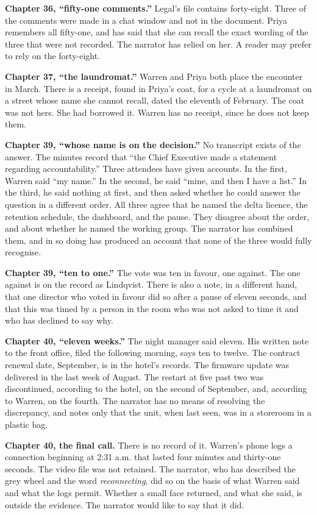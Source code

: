 {\textbf{Chapter 36, ``fifty-one comments.''} Legal's file contains forty-eight. Three of the comments were made in a chat window and not in the document. Priya remembers all fifty-one, and has said that she can recall the exact wording of the three that were not recorded. The narrator has relied on her. A reader may prefer to rely on the forty-eight.

\textbf{Chapter 37, ``the laundromat.''} Warren and Priya both place the encounter in March. There is a receipt, found in Priya's coat, for a cycle at a laundromat on a street whose name she cannot recall, dated the eleventh of February. The coat was not hers. She had borrowed it. Warren has no receipt, since he does not keep them.

\textbf{Chapter 39, ``whose name is on the decision.''} No transcript exists of the answer. The minutes record that ``the Chief Executive made a statement regarding accountability.'' Three attendees have given accounts. In the first, Warren said ``my name.'' In the second, he said ``mine, and then I have a list.'' In the third, he said nothing at first, and then asked whether he could answer the question in a different order. All three agree that he named the delta licence, the retention schedule, the dashboard, and the pause. They disagree about the order, and about whether he named the working group. The narrator has combined them, and in so doing has produced an account that none of the three would fully recognise.

\textbf{Chapter 39, ``ten to one.''} The vote was ten in favour, one against. The one against is on the record as Lindqvist. There is also a note, in a different hand, that one director who voted in favour did so after a pause of eleven seconds, and that this was timed by a person in the room who was not asked to time it and who has declined to say why.

\textbf{Chapter 40, ``eleven weeks.''} The night manager said eleven. His written note to the front office, filed the following morning, says ten to twelve. The contract renewal date, September, is in the hotel's records. The firmware update was delivered in the last week of August. The restart at five past two was discontinued, according to the hotel, on the second of September, and, according to Warren, on the fourth. The narrator has no means of resolving the discrepancy, and notes only that the unit, when last seen, was in a storeroom in a plastic bag.

\textbf{Chapter 40, the final call.} There is no record of it. Warren's phone logs a connection beginning at 2:31 a.m. that lasted four minutes and thirty-one seconds. The video file was not retained. The narrator, who has described the grey wheel and the word \emph{reconnecting}, did so on the basis of what Warren said and what the logs permit. Whether a small face returned, and what she said, is outside the evidence. The narrator would like to say that it did.
}
